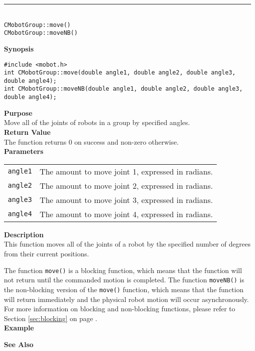 \noindent
\vspace{5pt}
\rule{4.5in}{0.015in}\\
\noindent
{\LARGE \texttt{CMobotGroup::move()}}\\
{\LARGE \texttt{CMobotGroup::moveNB()}}\\
{}

\noindent
{\bf Synopsis}
\vspace{-8pt}
\begin{verbatim}
#include <mobot.h>
int CMobotGroup::move(double angle1, double angle2, double angle3, double angle4);
int CMobotGroup::moveNB(double angle1, double angle2, double angle3, double angle4);
\end{verbatim}

\noindent
{\bf Purpose}\\
Move all of the joints of robots in a group by specified angles.\\

\noindent
{\bf Return Value}\\
The function returns 0 on success and non-zero otherwise.\\

\noindent
{\bf Parameters}\\
\vspace{-0.1in}
\begin{description}
\item               
\begin{tabular}{p{15 mm}p{105 mm}}
\texttt{angle1} & The amount to move joint 1, expressed in radians. \\
\texttt{angle2} & The amount to move joint 2, expressed in radians. \\
\texttt{angle3} & The amount to move joint 3, expressed in radians. \\
\texttt{angle4} & The amount to move joint 4, expressed in radians. \\
\end{tabular}
\end{description}
\noindent
{\bf Description}\\
This function moves all of the joints of a robot by the specified number of degrees
from their current positions. 

The function \texttt{move()} is a blocking function,
which means that the function will not return until the commanded motion is 
completed. The function \texttt{moveNB()} is the non-blocking version of
the \texttt{move()} function, which means that the function will return
immediately and the physical robot motion will occur asynchronously. For 
more information on blocking and non-blocking functions, please refer to 
Section \ref{sec:blocking} on page \pageref{sec:blocking}.\\

\noindent
{\bf Example}\\
\noindent

\noindent
{\bf See Also}\\

